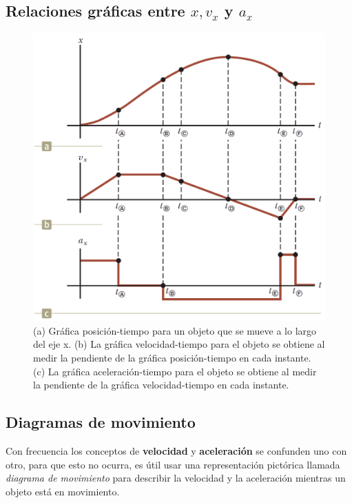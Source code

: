   \subsection{Relaciones gráficas entre $x, v_{x}$ y $a_{x}$}
    \begin{figure}[H]
      \centering
      \includegraphics[scale=0.3]{1/graphics_2/figure_1}
      \caption{(a) Gráfica posición-tiempo para un objeto que se mueve a lo largo del eje x. (b) La gráfica
      velocidad-tiempo para el objeto se obtiene al medir la pendiente de la gráfica posición-tiempo en cada instante.
      (c) La gráfica aceleración-tiempo para el objeto se obtiene al medir la pendiente de la gráfica velocidad-tiempo
      en cada instante.}
    \end{figure}

  \subsection{Diagramas de movimiento}
    \PN Con frecuencia los conceptos de \textbf{velocidad} y \textbf{aceleración} se confunden uno con otro, para que
    esto no ocurra, es útil usar una representación pictórica llamada \textit{diagrama de movimiento} para describir la
    velocidad y la aceleración mientras un objeto está en movimiento.

